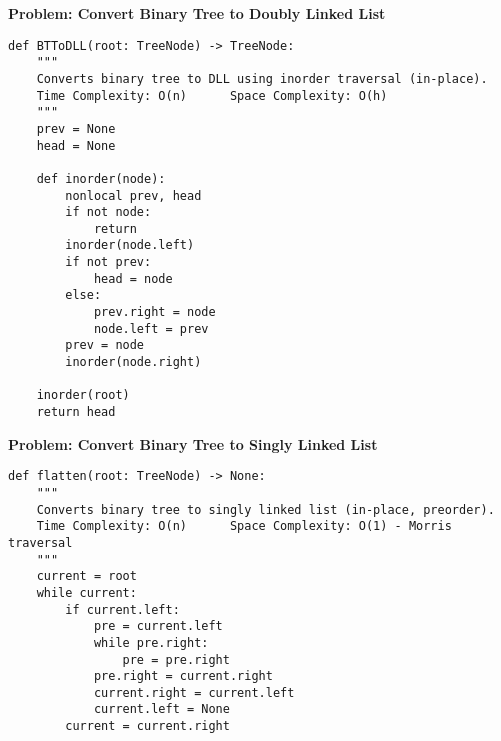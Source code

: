 \noindent\textbf{Problem: Convert Binary Tree to Doubly Linked List}
\begin{verbatim}
def BTToDLL(root: TreeNode) -> TreeNode:
    """
    Converts binary tree to DLL using inorder traversal (in-place).
    Time Complexity: O(n)      Space Complexity: O(h)
    """
    prev = None
    head = None
    
    def inorder(node):
        nonlocal prev, head
        if not node:
            return
        inorder(node.left)
        if not prev:
            head = node
        else:
            prev.right = node
            node.left = prev
        prev = node
        inorder(node.right)
    
    inorder(root)
    return head
\end{verbatim}
\noindent\textbf{Problem: Convert Binary Tree to Singly Linked List}
\begin{verbatim}
def flatten(root: TreeNode) -> None:
    """
    Converts binary tree to singly linked list (in-place, preorder).
    Time Complexity: O(n)      Space Complexity: O(1) - Morris traversal
    """
    current = root
    while current:
        if current.left:
            pre = current.left
            while pre.right:
                pre = pre.right
            pre.right = current.right
            current.right = current.left
            current.left = None
        current = current.right
\end{verbatim}

